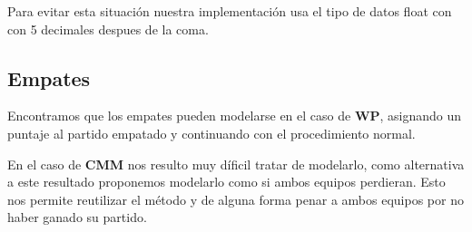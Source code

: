 Para evitar esta situaci\'on nuestra implementación usa el tipo de datos float con con 5 decimales despues de la coma.\\


\subsection{Empates}

Encontramos que los empates pueden modelarse en el caso de \textbf{WP}, asignando un puntaje al partido empatado y continuando con el procedimiento normal.

En el caso de \textbf{CMM} nos resulto muy díficil tratar de modelarlo, como alternativa a este resultado proponemos modelarlo como si ambos equipos perdieran. Esto nos permite 
reutilizar el método y de alguna forma penar a ambos equipos por no haber ganado su partido.
















